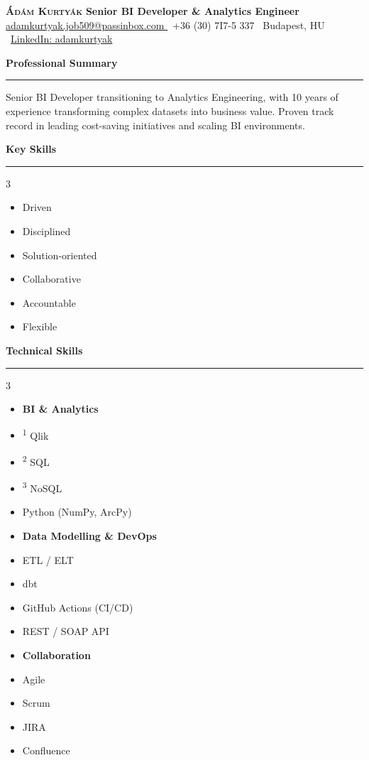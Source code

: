 \documentclass[a4paper,11pt]{article}
\newcommand{\sqcite}[1]{\textsuperscript{#1}}
\newcommand{\heading}[1]{\vspace{6pt}\textbf{\large #1}\vspace{2pt}\hrule\vspace{2pt}}
\newcommand{\columnitems}[1]{%
    \begin{multicols}{3}%
    \begin{itemize}[noitemsep]
        #1
    \end{itemize}
    \end{multicols}%
}
\begin{document}
\begin{center}
    {\LARGE \textbf{\textsc {Ádám Kurtyák} \textbar}} \textbf{ Senior BI Developer \& Analytics Engineer} \\
    \vspace{4pt}
    \small \href{mailto:adamkurtyak.job509@passinbox.com}{adamkurtyak.job509@passinbox.com } \textbar\ +36 (30) 7I7-5 337 \textbar\ Budapest, HU \textbar\ \href{https://www.linkedin.com/in/adamkurtyak/}{LinkedIn: adamkurtyak}
\end{center}

\vspace{-4pt}
\heading{Professional Summary}
\vspace{4pt}
\hspace{15pt}
Senior BI Developer transitioning to Analytics Engineering, with 10 years of experience transforming complex datasets into business value.
Proven track record in leading cost-saving initiatives and scaling BI environments.

\heading{Key Skills}
\vspace{-10pt}
\columnitems{
    \item Driven
    \item Disciplined
    \item Solution-oriented
    \item Collaborative
    \item Accountable
    \item Flexible
}
\vspace{-10pt}
\heading{Technical Skills}
\vspace{-10pt}
\begin{multicols}{3}
    \begin{itemize}[noitemsep, topsep=0pt]
        \item [] \textbf{BI \& Analytics}
        \item \sqcite{1} Qlik
        \item \sqcite{2} SQL
        \item \sqcite{3} NoSQL
        \item Python (NumPy, ArcPy)
    \end{itemize}
    \columnbreak
    \begin{itemize}[noitemsep, topsep=0pt]
        \item [] \textbf{Data Modelling \&  DevOps} 
        \item ETL / ELT
        \item dbt
        \item GitHub Actions (CI/CD)
        \item REST / SOAP API
    \end{itemize}
    \columnbreak
    \begin{itemize}[noitemsep, topsep=0pt]
        \item [] \textbf{Collaboration}
        \item Agile
        \item Scrum
        \item JIRA
        \item Confluence
    \end{itemize}
\end{multicols}
\end{document}
